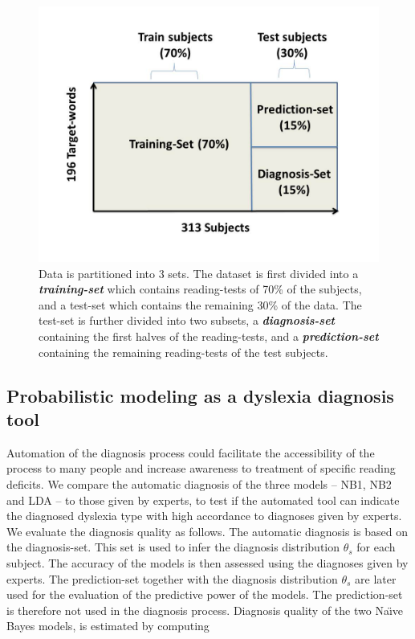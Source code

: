 {{{\begin{figure}[H]
\vspace{.3in}
\includegraphics[width=\linewidth]{Figures/Ch1/trainTest2}
\caption{Data is partitioned into 3 sets. The dataset is first divided into a \textit {\textbf {training-set}} which contains reading-tests of 70\% of the subjects, and a test-set which contains the remaining 30\% of the data. The test-set is further divided into two subsets, a \textit {\textbf {diagnosis-set}} containing the first halves of the reading-tests, and a \textit {\textbf {prediction-set}} containing the remaining reading-tests of the test subjects.}
\end{figure}

\subsection{Probabilistic modeling as a dyslexia diagnosis tool}
Automation of the diagnosis process could facilitate the accessibility of the process to many people and increase awareness to treatment of specific reading deficits. We compare the automatic diagnosis of the three models -- NB1, NB2 and LDA -- to those given by experts, to test if the automated tool can indicate the diagnosed dyslexia type with high accordance to diagnoses given by experts.
We evaluate the diagnosis quality as follows. The automatic diagnosis is based on the diagnosis-set. This set is used to infer the diagnosis distribution $ \theta_{s} $ for each subject. The accuracy of the models is then assessed using the diagnoses given by experts. The prediction-set together with the diagnosis distribution $ \theta_{s} $ are later used for the evaluation of the predictive power of the models. The prediction-set is therefore not used in the diagnosis process.
Diagnosis quality of the two Na\"{\i}ve Bayes models, is estimated by computing 

}}}
